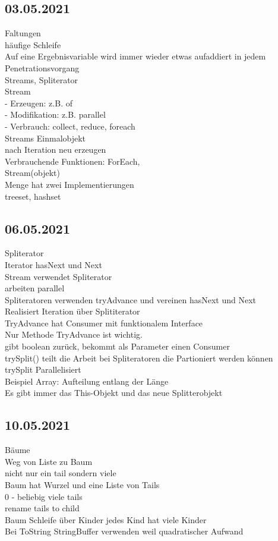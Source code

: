 \documentclass[paper=A4]{article}
\begin{document}
	\subsection*{03.05.2021}
	Faltungen \\
	häufige Schleife \\
	Auf eine Ergebnisvariable wird immer wieder etwas aufaddiert in jedem Penetrationsvorgang \\
	Streams, Spliterator \\
	Stream \\
	- Erzeugen: z.B. of \\
	- Modifikation: z.B. parallel \\
	- Verbrauch: collect, reduce, foreach \\
	Streams Einmalobjekt \\
	nach Iteration neu erzeugen \\
	Verbrauchende Funktionen: ForEach, \\
	Stream(objekt) \\
	Menge hat zwei Implementierungen \\
	 treeset, hashset
	\subsection*{06.05.2021}
	Spliterator \\
	Iterator hasNext und Next \\
	Stream verwendet Spliterator \\
	arbeiten parallel \\
	Spliteratoren verwenden tryAdvance und vereinen hasNext und Next  \\
	Realisiert Iteration über Splititerator \\
	TryAdvance hat Consumer mit funktionalem Interface \\
	Nur Methode TryAdvance ist wichtig. \\
	gibt boolean zurück, bekommt als Parameter einen Consumer  \\
	trySplit() teilt die Arbeit bei Spliteratoren die Partioniert werden können  \\
	trySplit Parallelisiert \\
	Beispiel Array: Aufteilung entlang der Länge \\
	Es gibt immer das This-Objekt und das neue Splitterobjekt
	\subsection*{10.05.2021}
	Bäume \\
	Weg von Liste zu Baum \\
	nicht nur ein tail sondern viele \\
	Baum hat Wurzel und eine Liste von Tails \\
	0 - beliebig viele tails \\
	rename tails to child \\
	Baum Schleife über Kinder jedes Kind hat viele Kinder  \\
	Bei ToString StringBuffer verwenden weil quadratischer Aufwand \\
\end{document}
